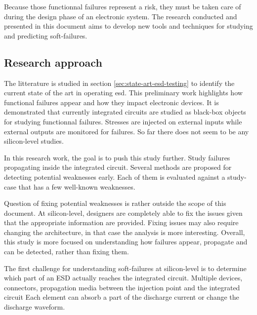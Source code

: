 
Because those functionnal failures represent a risk, they must be taken care of during the design phase of an electronic system.
The research conducted and presented in this document aims to develop new tools and techniques for studying and predicting soft-failures.

\subsection{Research approach}

The litterature is studied in section \ref{sec:state-art-esd-testing} to identify the current state of the art in operating \gls{esd}.
This preliminary work highlights how functional failures appear and how they impact electronic devices.
It is demonstrated that currently integrated circuits are studied as black-box objects for studying functionnal failures.
Stresses are injected on external inputs while external outputs are monitored for failures.
So far there does not seem to be any silicon-level studies.

In this research work, the goal is to push this study further.
Study failures propagating inside the integrated circuit.
Several methods are proposed for detecting potential weaknesses early.
Each of them is evaluated against a study-case that has a few well-known weaknesses.

Question of fixing potential weaknesses is rather outside the scope of this document.
At silicon-level, designers are completely able to fix the issues given that the appropriate information are provided.
Fixing issues may also require changing the architecture, in that case the analysis is more interesting.
Overall, this study is more focused on understanding how failures appear, propagate and can be detected, rather than fixing them.

The first challenge for understanding soft-failures at silicon-level is to determine which part of an \gls{ESD} actually reaches the integrated circuit.
Multiple devices, connectors, propagation media between the injection point and the integrated circuit
Each element can absorb a part of the discharge current or change the discharge waveform.

